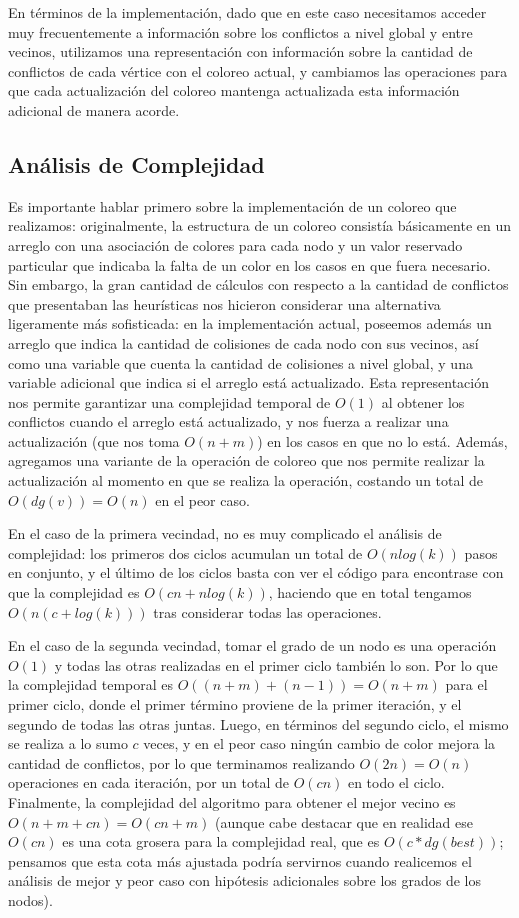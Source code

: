\documentclass{article}
\theoremstyle{definition}
\theoremstyle{remark}
\begin{document}
En términos de la implementación, dado que en este caso necesitamos acceder muy frecuentemente a información sobre los conflictos a nivel global y entre vecinos, utilizamos una representación con información sobre la cantidad de conflictos de cada vértice con el coloreo actual, y cambiamos las operaciones para que cada actualización del coloreo mantenga actualizada esta información adicional de manera acorde.

\subsection{Análisis de Complejidad}

Es importante hablar primero sobre la implementación de un coloreo que realizamos: originalmente, la estructura de un coloreo consistía básicamente en un arreglo con una asociación de colores para cada nodo y un valor reservado particular que indicaba la falta de un color en los casos en que fuera necesario. Sin embargo, la gran cantidad de cálculos con respecto a la cantidad de conflictos que presentaban las heurísticas nos hicieron considerar una alternativa ligeramente más sofisticada: en la implementación actual, poseemos además un arreglo que indica la cantidad de colisiones de cada nodo con sus vecinos, así como una variable que cuenta la cantidad de colisiones a nivel global, y una variable adicional que indica si el arreglo está actualizado. Esta representación nos permite garantizar una complejidad temporal de $O(1)$ al obtener los conflictos cuando el arreglo está actualizado, y nos fuerza a realizar una actualización (que nos toma $O(n + m)$) en los casos en que no lo está. Además, agregamos una variante de la operación de coloreo que nos permite realizar la actualización al momento en que se realiza la operación, costando un total de $O(dg(v)) = O(n)$ en el peor caso.

En el caso de la primera vecindad, no es muy complicado el análisis de complejidad: los primeros dos ciclos acumulan un total de $O(n log(k))$ pasos en conjunto, y el último de los ciclos basta con ver el código para encontrase con que la complejidad es $O(cn + nlog(k))$, haciendo que en total tengamos $O(n(c + log(k)))$ tras considerar todas las operaciones. 

En el caso de la segunda vecindad, tomar el grado de un nodo es una operación $O(1)$ y todas las otras realizadas en el primer ciclo también lo son. Por lo que la complejidad temporal es $O((n + m) + (n - 1)) = O(n + m)$ para el primer ciclo, donde el primer término proviene de la primer iteración, y el segundo de todas las otras juntas. Luego, en términos del segundo ciclo, el mismo se realiza a lo sumo $c$ veces, y en el peor caso ningún cambio de color mejora la cantidad de conflictos, por lo que terminamos realizando $O(2n) = O(n)$ operaciones en cada iteración, por un total de $O(cn)$ en todo el ciclo. Finalmente, la complejidad del algoritmo para obtener el mejor vecino es $O(n + m + cn) = O(cn + m)$ (aunque cabe destacar que en realidad ese $O(cn)$ es una cota grosera para la complejidad real, que es $O(c * dg(best))$; pensamos que esta cota más ajustada podría servirnos cuando realicemos el análisis de mejor y peor caso con hipótesis adicionales sobre los grados de los nodos).
\end{document}
